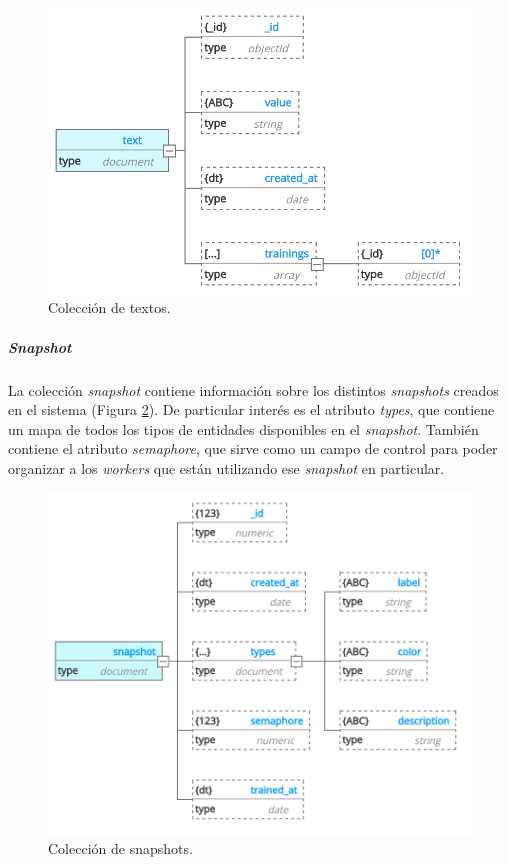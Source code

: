 \documentclass[12pt,a4paper,]{scrartcl}
\let\oldsubparagraph\subparagraph
\renewcommand{\subparagraph}[1]{\oldsubparagraph{#1}\mbox{}}
\begin{document}
\begin{figure}[H]

{\centering \includegraphics{assets/developer/db-text.png} 

}

\caption{Colección de textos.}\label{fig:developer-db-text}
\end{figure}

\hypertarget{snapshot}{%
\subparagraph{\texorpdfstring{\emph{Snapshot}}{Snapshot}}\label{snapshot}}

La colección \emph{snapshot} contiene información sobre los distintos \emph{snapshots} creados en el sistema (Figura \ref{fig:developer-db-snapshot}). De particular interés es el atributo \emph{types}, que contiene un mapa de todos los tipos de entidades disponibles en el \emph{snapshot}. También contiene el atributo \emph{semaphore}, que sirve como un campo de control para poder organizar a los \emph{workers} que están utilizando ese \emph{snapshot} en particular.

\begin{figure}[H]

{\centering \includegraphics{assets/developer/db-snapshot.pdf} 

}

\caption{Colección de snapshots.}\label{fig:developer-db-snapshot}
\end{figure}
\end{document}
